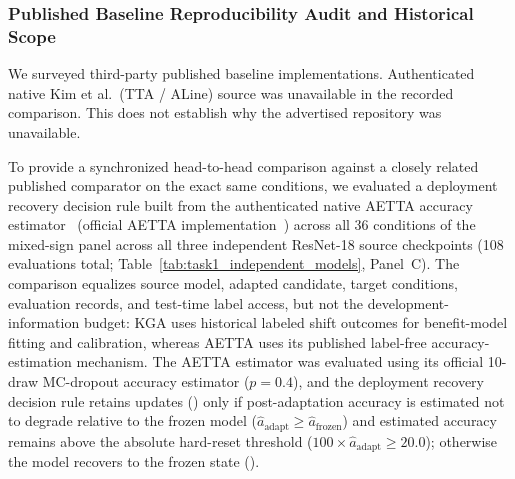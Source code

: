 

\subsubsection{Published Baseline Reproducibility Audit and Historical Scope}
\label{app:baseline-audit}

We surveyed third-party published baseline implementations. Authenticated native Kim et al.~(TTA / ALine) source was unavailable in the recorded comparison. This does not establish why the advertised repository was unavailable.

To provide a synchronized head-to-head comparison against a closely related published comparator on the exact same conditions, we evaluated a deployment recovery decision rule built from the authenticated native AETTA accuracy estimator~\cite{lee2024aetta} (official AETTA implementation~\cite{lee2024aetta}) across all 36 conditions of the mixed-sign panel across all three independent ResNet-18 source checkpoints (108 evaluations total; Table~\ref{tab:task1_independent_models}, Panel~C). The comparison equalizes source model, adapted candidate, target conditions, evaluation records, and test-time label access, but not the development-information budget: KGA uses historical labeled shift outcomes for benefit-model fitting and calibration, whereas AETTA uses its published label-free accuracy-estimation mechanism. The AETTA estimator was evaluated using its official 10-draw MC-dropout accuracy estimator ($p=0.4$), and the deployment recovery decision rule retains updates (\adapt) only if post-adaptation accuracy is estimated not to degrade relative to the frozen model ($\widehat{a}_{\mathrm{adapt}} \ge \widehat{a}_{\mathrm{frozen}}$) and estimated accuracy remains above the absolute hard-reset threshold ($100 \times \widehat{a}_{\mathrm{adapt}} \ge 20.0$); otherwise the model recovers to the frozen state (\freeze).

